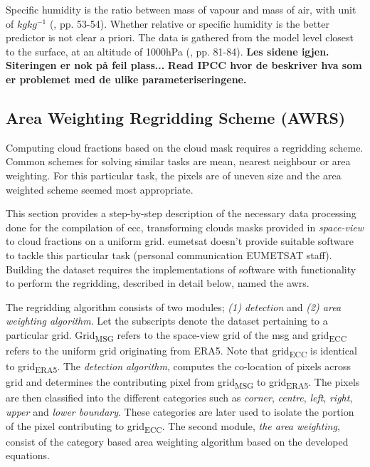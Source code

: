Specific humidity is the ratio between mass of vapour and mass of air, with unit of $kg kg^{-1}$ (\cite{lohmann2016}, pp. 53-54). Whether relative or specific humidity is the better predictor is not clear a priori. The data is gathered from the model level closest to the surface, at an altitude of 1000hPa (\cite{lohmann2016}, pp. 81-84). \textbf{Les sidene igjen. Siteringen er nok på feil plass...}
\textbf{Read IPCC hvor de beskriver hva som er problemet med de ulike parameteriseringene.}

\subsection{Area Weighting Regridding Scheme (AWRS)} \label{sec:remapping}
Computing cloud fractions based on the cloud mask requires a regridding scheme. Common schemes for solving similar tasks are mean, nearest neighbour or area weighting. For this particular task, the pixels are of uneven size and the area weighted scheme seemed most appropriate. 

This section provides a step-by-step description of the necessary data processing done for the compilation of \acrshort{ecc}, transforming clouds masks provided in \textit{space-view} to cloud fractions on a uniform grid. \acrshort{eumetsat} doesn't provide suitable software to tackle this particular task (personal communication EUMETSAT staff). Building the dataset requires the implementations of software with functionality to perform the regridding, described in detail below, named the \acrfull{awrs}.

The regridding algorithm consists of two modules; \textit{(1) detection} and \textit{(2) area weighting algorithm}. Let the subscripts denote the dataset pertaining to a particular grid. Grid\textsubscript{MSG} refers to the space-view grid of the \acrlong{msg} and grid\textsubscript{ECC} refers to the uniform grid originating from ERA5. Note that grid\textsubscript{ECC} is identical to  grid\textsubscript{ERA5}. The \textit{detection algorithm}, computes the co-location of pixels across grid and determines the contributing pixel from grid\textsubscript{MSG} to grid\textsubscript{ERA5}.
%
The pixels are then classified into the different categories such as \textit{corner}, \textit{centre}, \textit{left}, \textit{right}, \textit{upper} and \textit{lower boundary}. These categories are later used to isolate the portion of the pixel contributing to grid\textsubscript{ECC}.
The second module, \textit{the area weighting}, consist of the category based area weighting algorithm based on the developed equations.


